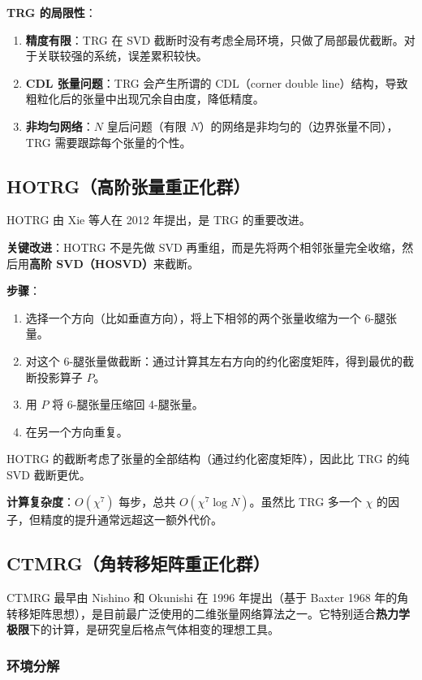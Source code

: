 \documentclass[12pt,a4paper]{ctexart}
\begin{document}
\textbf{TRG 的局限性}：
\begin{enumerate}
\item \textbf{精度有限}：TRG 在 SVD 截断时没有考虑全局环境，只做了局部最优截断。对于关联较强的系统，误差累积较快。
\item \textbf{CDL 张量问题}：TRG 会产生所谓的 CDL（corner double line）结构，导致粗粒化后的张量中出现冗余自由度，降低精度。
\item \textbf{非均匀网络}：$N$ 皇后问题（有限 $N$）的网络是非均匀的（边界张量不同），TRG 需要跟踪每个张量的个性。
\end{enumerate}

\subsection{HOTRG（高阶张量重正化群）}

HOTRG 由 Xie 等人在 2012 年提出，是 TRG 的重要改进。

\textbf{关键改进}：HOTRG 不是先做 SVD 再重组，而是先将两个相邻张量完全收缩，然后用\textbf{高阶 SVD（HOSVD）}来截断。

\textbf{步骤}：
\begin{enumerate}
\item 选择一个方向（比如垂直方向），将上下相邻的两个张量收缩为一个 6-腿张量。
\item 对这个 6-腿张量做截断：通过计算其左右方向的约化密度矩阵，得到最优的截断投影算子 $P$。
\item 用 $P$ 将 6-腿张量压缩回 4-腿张量。
\item 在另一个方向重复。
\end{enumerate}

HOTRG 的截断考虑了张量的全部结构（通过约化密度矩阵），因此比 TRG 的纯 SVD 截断更优。

\textbf{计算复杂度}：$O(\chi^7)$ 每步，总共 $O(\chi^7 \log N)$。虽然比 TRG 多一个 $\chi$ 的因子，但精度的提升通常远超这一额外代价。

\subsection{CTMRG（角转移矩阵重正化群）}

CTMRG 最早由 Nishino 和 Okunishi 在 1996 年提出（基于 Baxter 1968 年的角转移矩阵思想），是目前最广泛使用的二维张量网络算法之一。它特别适合\textbf{热力学极限}下的计算，是研究皇后格点气体相变的理想工具。

\subsubsection{环境分解}
\end{document}
